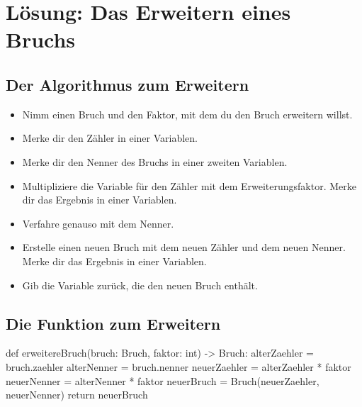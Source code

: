 \section{Lösung: Das Erweitern eines Bruchs}

\subsection*{Der Algorithmus zum Erweitern}

\begin{itemize}
	\item Nimm einen Bruch und den Faktor, mit dem du den Bruch erweitern willst.
	\item Merke dir den Zähler in einer Variablen.
	\item Merke dir den Nenner des Bruchs in einer zweiten Variablen.
	\item Multipliziere die Variable für den Zähler mit dem Erweiterungsfaktor. Merke dir das Ergebnis in einer Variablen.
	\item Verfahre genauso mit dem Nenner.
	\item Erstelle einen neuen Bruch mit dem neuen Zähler und dem neuen Nenner. Merke dir das Ergebnis in einer Variablen.
	\item Gib die Variable zurück, die den neuen Bruch enthält.
\end{itemize}

\subsection*{Die Funktion zum Erweitern}

\begin{codePython}
def erweitereBruch(bruch: Bruch, faktor: int) -> Bruch:
	alterZaehler = bruch.zaehler
	alterNenner = bruch.nenner
	neuerZaehler = alterZaehler * faktor
	neuerNenner = alterNenner * faktor
	neuerBruch = Bruch(neuerZaehler, neuerNenner)
	return neuerBruch
\end{codePython}

